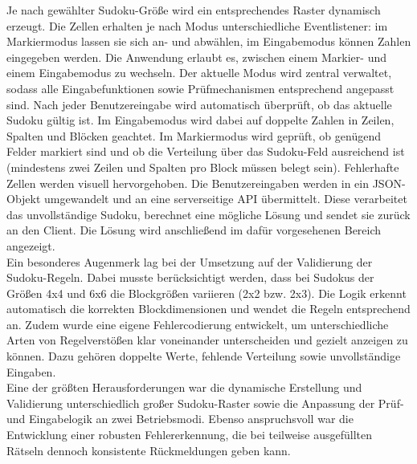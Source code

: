 Je nach gewählter Sudoku-Größe wird ein entsprechendes Raster dynamisch erzeugt.
Die Zellen erhalten je nach Modus unterschiedliche Eventlistener:
im Markiermodus lassen sie sich an- und abwählen, im Eingabemodus können Zahlen eingegeben werden.
Die Anwendung erlaubt es, zwischen einem Markier- und einem Eingabemodus zu wechseln.
Der aktuelle Modus wird zentral verwaltet, sodass alle Eingabefunktionen sowie Prüfmechanismen entsprechend angepasst sind.
Nach jeder Benutzereingabe wird automatisch überprüft, ob das aktuelle Sudoku gültig ist.
Im Eingabemodus wird dabei auf doppelte Zahlen in Zeilen, Spalten und Blöcken geachtet.
Im Markiermodus wird geprüft, ob genügend Felder markiert sind und ob die Verteilung über das Sudoku-Feld ausreichend ist (mindestens zwei Zeilen und Spalten pro Block müssen belegt sein).
Fehlerhafte Zellen werden visuell hervorgehoben. Die Benutzereingaben werden in ein JSON-Objekt umgewandelt und an eine serverseitige API übermittelt.
Diese verarbeitet das unvollständige Sudoku, berechnet eine mögliche Lösung und sendet sie zurück an den Client.
Die Lösung wird anschließend im dafür vorgesehenen Bereich angezeigt.
\\
Ein besonderes Augenmerk lag bei der Umsetzung auf der Validierung der Sudoku-Regeln.
Dabei musste berücksichtigt werden, dass bei Sudokus der Größen 4x4 und 6x6 die Blockgrößen variieren (2x2 bzw. 2x3).
Die Logik erkennt automatisch die korrekten Blockdimensionen und wendet die Regeln entsprechend an.
Zudem wurde eine eigene Fehlercodierung entwickelt,
um unterschiedliche Arten von Regelverstößen klar voneinander unterscheiden und gezielt anzeigen zu können.
Dazu gehören doppelte Werte, fehlende Verteilung sowie unvollständige Eingaben.
\\
Eine der größten Herausforderungen war die dynamische Erstellung und Validierung unterschiedlich großer Sudoku-Raster sowie die Anpassung der Prüf- und Eingabelogik an zwei Betriebsmodi.
Ebenso anspruchsvoll war die Entwicklung einer robusten Fehlererkennung,
die bei teilweise ausgefüllten Rätseln dennoch konsistente Rückmeldungen geben kann.